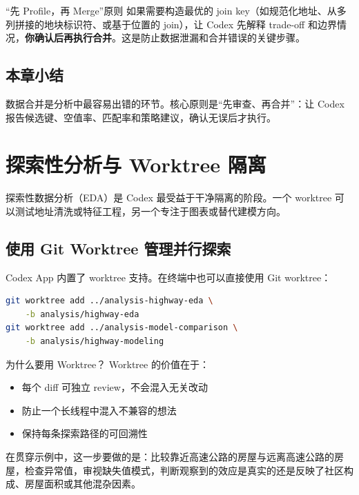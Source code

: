 \documentclass[a4paper]{article}
\begin{document}
\begin{importantbox}{``先 Profile，再 Merge''原则}
如果需要构造最优的 join key（如规范化地址、从多列拼接的地块标识符、或基于位置的 join），让 Codex 先解释 trade-off 和边界情况，\textbf{你确认后再执行合并}。这是防止数据泄漏和合并错误的关键步骤。
\end{importantbox}

\subsection{本章小结}
数据合并是分析中最容易出错的环节。核心原则是``先审查、再合并''：让 Codex 报告候选键、空值率、匹配率和策略建议，确认无误后才执行。

\section{探索性分析与 Worktree 隔离}

探索性数据分析（EDA）是 Codex 最受益于干净隔离的阶段。一个 worktree 可以测试地址清洗或特征工程，另一个专注于图表或替代建模方向。

\subsection{使用 Git Worktree 管理并行探索}

Codex App 内置了 worktree 支持。在终端中也可以直接使用 Git worktree：

\begin{lstlisting}[caption={创建 worktree 隔离不同探索方向},language=bash]
git worktree add ../analysis-highway-eda \
    -b analysis/highway-eda
git worktree add ../analysis-model-comparison \
    -b analysis/highway-modeling
\end{lstlisting}

\begin{knowledgebox}{为什么要用 Worktree？}
Worktree 的价值在于：
\begin{itemize}[nosep]
    \item 每个 diff 可独立 review，不会混入无关改动
    \item 防止一个长线程中混入不兼容的想法
    \item 保持每条探索路径的可回溯性
\end{itemize}
\end{knowledgebox}

在贯穿示例中，这一步要做的是：比较靠近高速公路的房屋与远离高速公路的房屋，检查异常值，审视缺失值模式，判断观察到的效应是真实的还是反映了社区构成、房屋面积或其他混杂因素。
\end{document}

